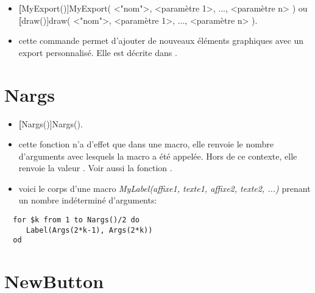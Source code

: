 \begin{itemize}
 \item \textbf[MyExport()]{MyExport( <"nom">, <paramètre 1>, ..., <paramètre n> )} ou \textbf[draw()]{draw( <"nom">, <paramètre 1>, ..., <paramètre n> )}. \item \desc cette commande permet d'ajouter de nouveaux éléments graphiques avec un export personnalisé. Elle est décrite dans .
\end{itemize}

\section{Nargs}\label{cmdNargs}

\begin{itemize}
 \item \util \textbf[Nargs()]{Nargs()}. 
 \item \desc cette fonction n'a d'effet que dans une macro, elle renvoie le nombre d'arguments avec lesquels la macro a été appelée. Hors de ce contexte, elle renvoie la valeur \Nil. Voir aussi la fonction . \item\exem voici le corps d'une macro \textit{MyLabel(affixe1, texte1, affixe2, texte2, ...)} prenant un nombre indéterminé d'arguments:
\end{itemize}

\begin{verbatim}
  for $k from 1 to Nargs()/2 do
     Label(Args(2*k-1), Args(2*k))
  od
\end{verbatim}

\section{NewButton}\label{cmdNewButton}

